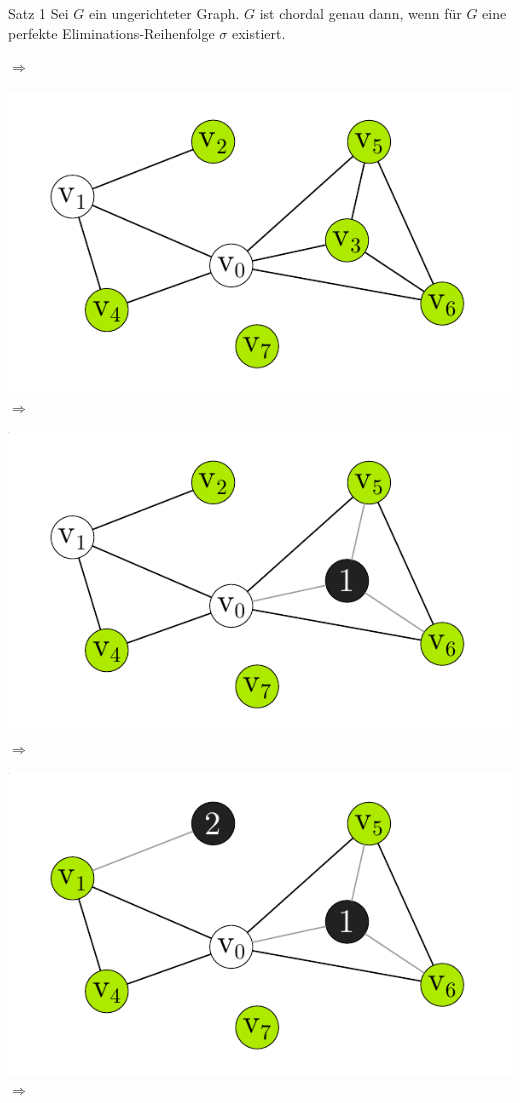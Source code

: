 \documentclass[xcolor=x11names,compress]{beamer}
\begin{document}
\begin{frame}
	\begin{block}{Satz 1}
		Sei \( G \) ein ungerichteter Graph. \( G \) ist chordal genau dann, wenn für \( G \) eine perfekte Eliminations-Reihenfolge \( \sigma \) existiert.
	\end{block}
	\begin{overprint}
		\( \Rightarrow \)

		\includegraphics[scale=1.0]{img/graph/simplicialconstruction/01.pdf}
		\onslide<3>
		\( \Rightarrow \)

		\includegraphics[scale=1.0]{img/graph/simplicialconstruction/02.pdf}
		\onslide<4>
		\( \Rightarrow \)

		\includegraphics[scale=1.0]{img/graph/simplicialconstruction/03.pdf}
		\onslide<5>
		\( \Rightarrow \)


\end{overprint}
\end{frame}
\end{document}
